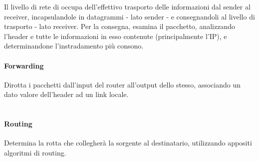 Il livello di rete di occupa dell'effettivo trasporto delle informazioni dal sender al receiver, incapsulandole in datagrammi - lato sender - e consegnandoli al livello di trasporto - lato receiver.
Per la consegna, esamina il pacchetto, analizzando l'header e tutte le informazioni in esso contenute (principalmente l'IP), e determinandone l'instradamento più consono.

\paragraph{Forwarding}
Dirotta i pacchetti dall'input del router all'output dello stesso, associando un dato valore dell'header ad un link locale. \\\\
\paragraph{Routing}
Determina la rotta che collegherà la sorgente al destinatario, utilizzando appositi algoritmi di routing.\\\\

